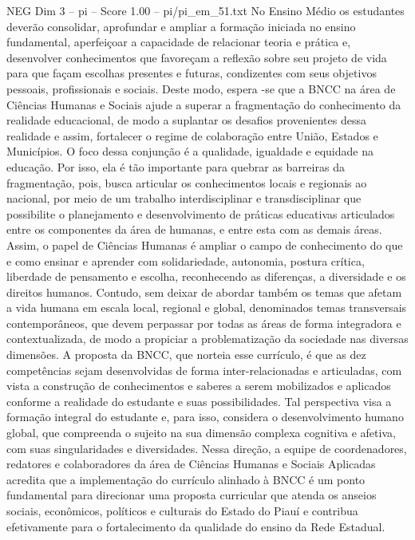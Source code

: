 \begin{textsample}{NEG Dim 3 – pi – Score 1.00 – pi/pi\_em\_51.txt}
No Ensino Médio os estudantes deverão consolidar, aprofundar e ampliar a formação iniciada no ensino fundamental, aperfeiçoar a capacidade de relacionar teoria e prática e, desenvolver conhecimentos que favoreçam a reflexão sobre seu projeto de vida para que façam escolhas presentes e futuras, condizentes com seus objetivos pessoais, profissionais e sociais.
Deste modo, espera -se que a BNCC na área de Ciências Humanas e Sociais ajude a superar a fragmentação do conhecimento da realidade educacional, de modo a suplantar os desafios provenientes dessa realidade e assim, fortalecer o regime de colaboração entre União, Estados e Municípios.
O foco dessa conjunção é a qualidade, igualdade e equidade na educação.
Por isso, ela é tão importante para quebrar as barreiras da fragmentação, pois, busca articular os conhecimentos locais e regionais ao nacional, por meio de um trabalho interdisciplinar e transdisciplinar que possibilite o planejamento e desenvolvimento de práticas educativas articulados entre os componentes da área de humanas, e entre esta com as demais áreas.
Assim, o papel de Ciências Humanas é ampliar o campo de conhecimento do que e como ensinar e aprender com solidariedade, autonomia, postura crítica, liberdade de pensamento e escolha, reconhecendo as diferenças, a diversidade e os direitos humanos.
Contudo, sem deixar de abordar também os temas que afetam a vida humana em escala local, regional e global, denominados temas transversais contemporâneos, que devem perpassar por todas as áreas de forma integradora e contextualizada, de modo a propiciar a problematização da sociedade nas diversas dimensões.
A proposta da BNCC, que norteia esse currículo, é que as dez competências sejam desenvolvidas de forma inter-relacionadas e articuladas, com vista a construção de conhecimentos e saberes a serem mobilizados e aplicados conforme a realidade do estudante e suas possibilidades.
Tal perspectiva visa a formação integral do estudante e, para isso, considera o desenvolvimento humano global, que compreenda o sujeito na sua dimensão complexa cognitiva e afetiva, com suas singularidades e diversidades.
Nessa direção, a equipe de coordenadores, redatores e colaboradores da área de Ciências Humanas e Sociais Aplicadas acredita que a implementação do currículo alinhado à BNCC é um ponto fundamental para direcionar uma proposta curricular que atenda os anseios sociais, econômicos, políticos e culturais do Estado do Piauí e contribua efetivamente para o fortalecimento da qualidade do ensino da Rede Estadual.

\end{textsample}
